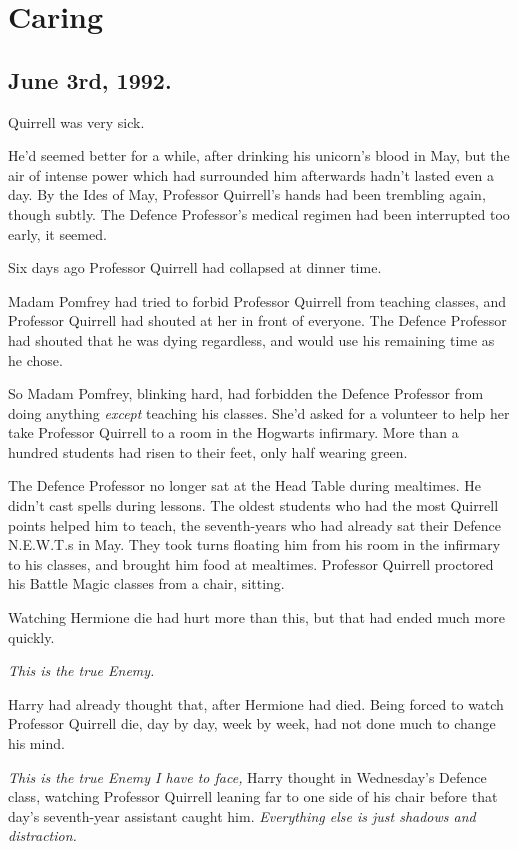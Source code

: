 \chapter{Caring}

\section{June 3rd, 1992.}

 Quirrell was very sick.

\hplettrineextrapara
He’d seemed better for a while, after drinking his unicorn’s blood in May, but the air of intense power which had surrounded him afterwards hadn’t lasted even a day. By the Ides of May, Professor Quirrell’s hands had been trembling again, though subtly. The Defence Professor’s medical regimen had been interrupted too early, it seemed.

Six days ago Professor Quirrell had collapsed at dinner time.

Madam Pomfrey had tried to forbid Professor Quirrell from teaching classes, and Professor Quirrell had shouted at her in front of everyone. The Defence Professor had shouted that he was dying regardless, and would use his remaining time as he chose.

So Madam Pomfrey, blinking hard, had forbidden the Defence Professor from doing anything \emph{except} teaching his classes. She’d asked for a volunteer to help her take Professor Quirrell to a room in the Hogwarts infirmary. More than a hundred students had risen to their feet, only half wearing green.

The Defence Professor no longer sat at the Head Table during mealtimes. He didn’t cast spells during lessons. The oldest students who had the most Quirrell points helped him to teach, the seventh-years who had already sat their Defence N.E.W.T.s in May. They took turns floating him from his room in the infirmary to his classes, and brought him food at mealtimes. Professor Quirrell proctored his Battle Magic classes from a chair, sitting.

Watching Hermione die had hurt more than this, but that had ended much more quickly.

\emph{This is the true Enemy.}

Harry had already thought that, after Hermione had died. Being forced to watch Professor Quirrell die, day by day, week by week, had not done much to change his mind.

\emph{This is the true Enemy I have to face,} Harry thought in Wednesday’s Defence class, watching Professor Quirrell leaning far to one side of his chair before that day’s seventh-year assistant caught him. \emph{Everything else is just shadows and distraction.}

